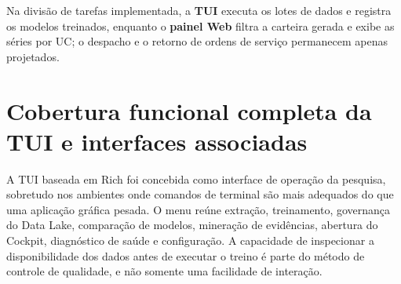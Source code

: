 Na divisão de tarefas implementada, a \textbf{TUI} executa os lotes de dados e registra os modelos treinados, enquanto o \textbf{painel Web} filtra a carteira gerada e exibe as séries por UC; o despacho e o retorno de ordens de serviço permanecem apenas projetados.

\section{Cobertura funcional completa da TUI e interfaces associadas}\label{cobertura-funcional-completa-da-tui-e-interfaces-associadas}

A TUI baseada em Rich foi concebida como interface de operação da pesquisa, sobretudo nos ambientes onde comandos de terminal são mais adequados do que uma aplicação gráfica pesada. O menu reúne extração, treinamento, governança do Data Lake, comparação de modelos, mineração de evidências, abertura do Cockpit, diagnóstico de saúde e configuração. A capacidade de inspecionar a disponibilidade dos dados antes de executar o treino é parte do método de controle de qualidade, e não somente uma facilidade de interação.


